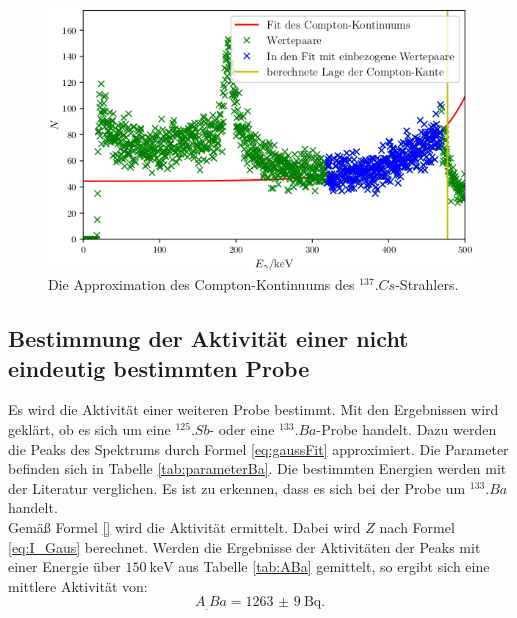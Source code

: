 \begin{figure}
	\centering
	\includegraphics[width=\linewidth-70pt,height=\textheight-70pt,keepaspectratio]{content/images/Cs137Kon.png}
	\caption{Die Approximation des Compton-Kontinuums des $^{137}.{Cs}$-Strahlers.}
	\label{fig:Comptonkontinuum}
\end{figure}

\subsection{Bestimmung der Aktivität einer nicht eindeutig bestimmten Probe}

Es wird die Aktivität einer weiteren Probe bestimmt. Mit den Ergebnissen wird geklärt, ob es sich um eine $^{125}.{Sb}$- oder eine $^{133}.{Ba}$-Probe handelt.
Dazu werden die Peaks des Spektrums durch Formel \eqref{eq:gaussFit} approximiert. Die Parameter befinden sich in Tabelle \ref{tab:parameterBa}. Die bestimmten Energien werden mit der Literatur \cite{KHAZOV2011855} verglichen. Es ist zu erkennen, dass es sich bei der Probe um $^{133}.{Ba}$ handelt.\\
Gemäß Formel \eqref{} wird die Aktivität ermittelt. Dabei wird $Z$ nach Formel \eqref{eq:I_Gaus} berechnet. Werden die Ergebnisse der Aktivitäten der Peaks mit einer Energie über $\SI{150}{\kilo\electronvolt}$ aus Tabelle \ref{tab:ABa} gemittelt, so ergibt sich eine mittlere Aktivität von:
\[
A_.{Ba} = \SI{1263(9)}{\becquerel}\text{.}
\]

